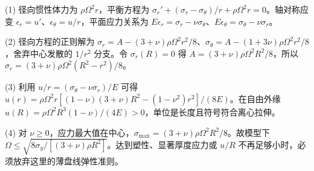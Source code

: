 (1) 径向惯性体力为 \(\rho\Omega^2r\)，平衡方程为 \(\sigma_r'+(\sigma_r-\sigma_\theta)/r+\rho\Omega^2r=0\)。轴对称应变 \(\epsilon_r=u'\)、\(\epsilon_\theta=u/r\)，平面应力关系为 \(E\epsilon_r=\sigma_r-\nu\sigma_\theta\)、\(E\epsilon_\theta=\sigma_\theta-\nu\sigma_r\)。

(2) 径向方程的正则解为 \(\sigma_r=A-(3+\nu)\rho\Omega^2r^2/8\)、\(\sigma_\theta=A-(1+3\nu)\rho\Omega^2r^2/8\)，舍弃中心发散的 \(1/r^2\) 分支。令 \(\sigma_r(R)=0\) 得 \(A=(3+\nu)\rho\Omega^2R^2/8\)，所以 \(\sigma_r=(3+\nu)\rho\Omega^2(R^2-r^2)/8\)。

(3) 利用 \(u/r=(\sigma_\theta-\nu\sigma_r)/E\) 可得 \(u(r)=\rho\Omega^2r[(1-\nu)(3+\nu)R^2-(1-\nu^2)r^2]/(8E)\)。在自由外缘 \(u(R)=\rho\Omega^2R^3(1-\nu)/(4E)>0\)，单位是长度且符号符合离心拉伸。

(4) 对 \(\nu\ge0\)，应力最大值在中心，\(\sigma_{\max}=(3+\nu)\rho\Omega^2R^2/8\)。故模型下 \(\Omega\le\sqrt{8\sigma_y/[(3+\nu)\rho R^2]}\)。达到塑性、显著厚度应力或 \(u/R\) 不再足够小时，必须放弃这里的薄盘线弹性准则。
